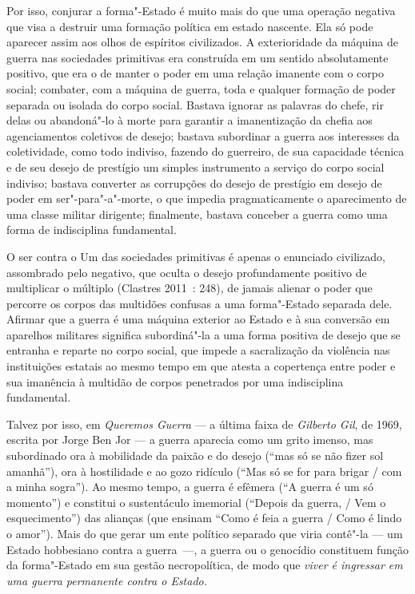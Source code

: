 Por isso, conjurar a forma"-Estado é muito mais do que uma operação
negativa que visa a destruir uma formação política em estado nascente.
Ela só pode aparecer assim aos olhos de espíritos civilizados. A
exterioridade da máquina de guerra nas sociedades primitivas era
construída em um sentido absolutamente positivo, que era o de manter o
poder em uma relação imanente com o corpo social; combater, com a
máquina de guerra, toda e qualquer formação de poder separada ou isolada
do corpo social. Bastava ignorar as palavras do chefe, rir delas ou
abandoná"-lo à morte para garantir a imanentização da chefia aos
agenciamentos coletivos de desejo; bastava subordinar a guerra aos
interesses da coletividade, como todo indiviso, fazendo do guerreiro, de
sua capacidade técnica e de seu desejo de prestígio um simples
instrumento a serviço do corpo social indiviso; bastava converter as
corrupções do desejo de prestígio em desejo de poder em
ser"-para"-a"-morte, o que impedia pragmaticamente o aparecimento de uma
classe militar dirigente; finalmente, bastava conceber a guerra como uma
forma de indisciplina fundamental.

O ser contra o Um das sociedades primitivas é apenas o enunciado
civilizado, assombrado pelo negativo, que oculta o desejo profundamente
positivo de multiplicar o múltiplo (Clastres 2011~: 248), de jamais
alienar o poder que percorre os corpos das multidões confusas a uma
forma"-Estado separada dele. Afirmar que a guerra é uma máquina exterior
ao Estado e à sua conversão em aparelhos militares significa
subordiná"-la a uma forma positiva de desejo que se entranha e reparte no
corpo social, que impede a sacralização da violência nas instituições
estatais ao mesmo tempo em que atesta a copertença entre poder e sua
imanência à multidão de corpos penetrados por uma indisciplina
fundamental.

Talvez por isso, em \emph{Queremos Guerra} --- a última faixa de
\emph{Gilberto Gil}, de 1969, escrita por Jorge Ben Jor --- a guerra
aparecia como um grito imenso, mas subordinado ora à mobilidade da
paixão e do desejo (``mas só se não fizer sol amanhã''), ora à
hostilidade e ao gozo ridículo (``Mas só se for para brigar / com a
minha sogra''). Ao mesmo tempo, a guerra é efêmera (``A guerra é um só
momento'') e constitui o sustentáculo imemorial (``Depois da guerra, /
Vem o esquecimento'') das alianças (que ensinam ``Como é feia a guerra /
Como é lindo o amor''). Mais do que gerar um ente político separado que
viria contê"-la --- um Estado hobbesiano contra a guerra~---, a guerra ou o
genocídio constituem função da forma"-Estado em sua gestão necropolítica,
de modo que \emph{viver é ingressar em uma guerra permanente contra o
Estado.}


